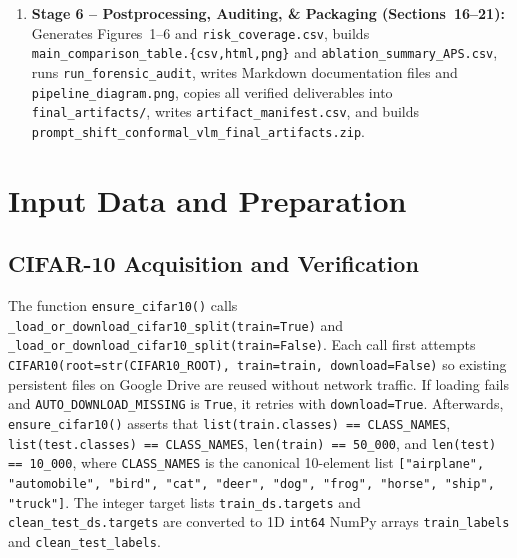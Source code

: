\documentclass[11pt,a4paper]{article}
\begin{document}
\begin{enumerate}
  \item \textbf{Stage 6 -- Postprocessing, Auditing, \& Packaging (Sections~16--21):} Generates Figures~1--6 and \texttt{risk\_\allowbreak{}coverage.csv}, builds \texttt{main\_comparison\_table.\{csv,html,png\}} and \texttt{ablation\_\allowbreak{}summary\_\allowbreak{}APS.csv}, runs \texttt{run\_\allowbreak{}forensic\_\allowbreak{}audit}, writes Markdown documentation files and \texttt{pipeline\_\allowbreak{}diagram.png}, copies all verified deliverables into \texttt{final\_\allowbreak{}artifacts/\allowbreak{}}, writes \texttt{artifact\_\allowbreak{}manifest.csv}, and builds \texttt{prompt\_\allowbreak{}shift\_\allowbreak{}conformal\_\allowbreak{}vlm\_\allowbreak{}final\_\allowbreak{}artifacts.zip}.
\end{enumerate}

\section{Input Data and Preparation}
\label{sec:data}

\subsection{CIFAR-10 Acquisition and Verification}
The function \texttt{ensure\_\allowbreak{}cifar10()} calls \texttt{\_\allowbreak{}load\_\allowbreak{}or\_\allowbreak{}download\_\allowbreak{}cifar10\_\allowbreak{}split(train=True)} and \texttt{\_\allowbreak{}load\_\allowbreak{}or\_\allowbreak{}download\_\allowbreak{}cifar10\_\allowbreak{}split(train=False)}. Each call first attempts \texttt{CIFAR10(root=str(CIFAR10\_\allowbreak{}ROOT), train=train, download=False)} so existing persistent files on Google Drive are reused without network traffic. If loading fails and \texttt{AUTO\_\allowbreak{}DOWNLOAD\_\allowbreak{}MISSING} is \texttt{True}, it retries with \texttt{download=True}. Afterwards, \texttt{ensure\_\allowbreak{}cifar10()} asserts that \texttt{list(train.classes) == CLASS\_\allowbreak{}NAMES}, \texttt{list(test.classes) == CLASS\_\allowbreak{}NAMES}, \texttt{len(train) == 50\_\allowbreak{}000}, and \texttt{len(test) == 10\_\allowbreak{}000}, where \texttt{CLASS\_\allowbreak{}NAMES} is the canonical 10-element list \texttt{["airplane", "automobile", "bird", "cat", "deer", "dog", "frog", "horse", "ship", "truck"]}. The integer target lists \texttt{train\_\allowbreak{}ds.targets} and \texttt{clean\_\allowbreak{}test\_\allowbreak{}ds.targets} are converted to 1D \texttt{int64} NumPy arrays \texttt{train\_\allowbreak{}labels} and \texttt{clean\_\allowbreak{}test\_\allowbreak{}labels}.
\end{document}
